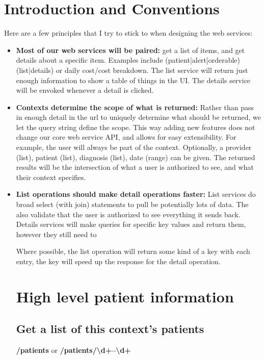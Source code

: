 \documentclass[12pt]{article}
\begin{document}
\section{Introduction and Conventions}

Here are a few principles that I try to stick to when designing the web services:
\begin{itemize}
\item \textbf{Most of our web services will be paired:} get a list of items, and get details about a specific item.  Examples include (patient|alert|orderable) (list|details) or daily cost/cost breakdown.  The list service will return just enough information to show a table of things in the UI.  The details service will be envoked whenever a detail is clicked.  

\item \textbf{Contexts determine the scope of what is returned:} Rather than pass in enough detail in the url to uniquely determine what should be returned, we let the query string define the scope.  This way adding new features does not change our core web service API, and allows for easy extensibility.  For example, the user will always be part of the context.  Optionally, a provider (list), patient (list), diagnosis (list), date (range) can be given.  The returned results will be the intersection of what a user is authorized to see, and what their context specifies.

\item \textbf{List operations should make detail operations faster:} List services do broad select (with join) statements to pull be potentially lots of data.  The also validate that the user is authorized to see everything it sends back.  Details services will make queries for specific key values and return them, however they still need to 

Where possible, the list operation will return some kind of a key with each entry, the key will speed up the response for the detail operation.  

\section{High level patient information}

\subsection{Get a list of this context's patients}
\textbf{/patients} or \textbf{/patients/{\textbackslash}d+--{\textbackslash}d+}


\end{itemize}
\end{document}
